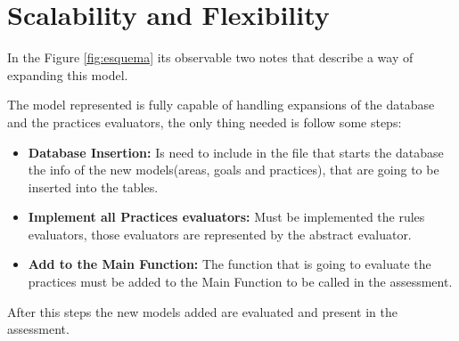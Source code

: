 \section{Scalability and Flexibility}

In the Figure \ref{fig:esquema} its observable two notes that describe a way of expanding this model.

The model represented is fully capable of handling expansions of the database and the practices evaluators, the only thing needed is follow some steps:
\begin{itemize}
	\item \textbf{Database Insertion: } Is need to include in the file that starts the database the info of the new models(areas, goals and practices), that are going to be inserted into the tables.
	\item \textbf{Implement all Practices evaluators: } Must be implemented the rules evaluators, those evaluators are represented by the abstract evaluator.
	\item \textbf{Add to the Main Function: } The function that is going to evaluate the practices must be added to the Main Function to be called in the assessment.
\end{itemize}

After this steps the new models added are evaluated and present in the assessment.